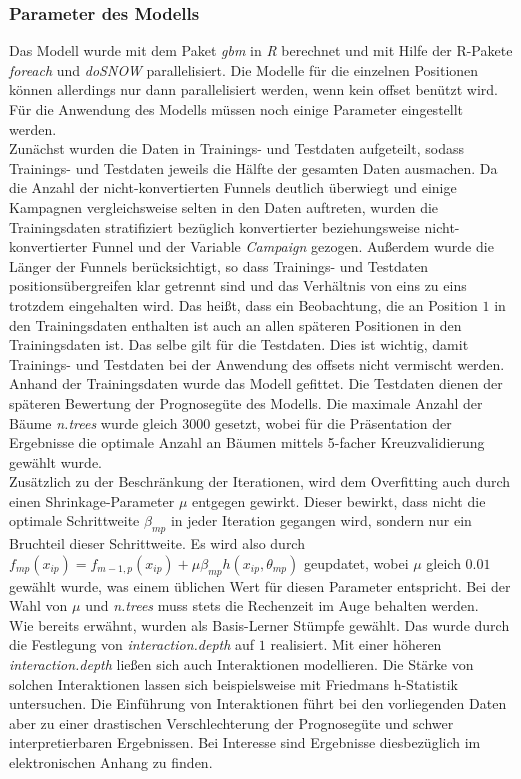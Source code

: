 \subsubsection*{Parameter des Modells}

Das Modell wurde mit dem Paket \textit{gbm} \cite{gbm} in \textit{R} \cite{r} berechnet und mit Hilfe der R-Pakete \textit{foreach} \cite{foreach} und \textit{doSNOW} \cite{dosnow} parallelisiert. Die Modelle für die einzelnen Positionen können allerdings nur dann parallelisiert werden, wenn kein offset benützt wird. Für die Anwendung des Modells müssen noch einige Parameter eingestellt werden.\\
Zunächst wurden die Daten in Trainings- und Testdaten aufgeteilt, sodass Trainings- und Testdaten jeweils die Hälfte der gesamten Daten ausmachen. Da die Anzahl der nicht-konvertierten Funnels deutlich überwiegt und einige Kampagnen vergleichsweise selten in den Daten auftreten, wurden die Trainingsdaten stratifiziert bezüglich konvertierter beziehungsweise nicht-konvertierter Funnel und der Variable \textit{Campaign} gezogen. Außerdem wurde die Länger der Funnels berücksichtigt, so dass  Trainings- und Testdaten positionsübergreifen klar getrennt sind und das Verhältnis von eins zu eins trotzdem eingehalten wird. Das heißt, dass ein Beobachtung, die an Position $1$ in den Trainingsdaten enthalten ist auch an allen späteren Positionen in den Trainingsdaten ist. Das selbe gilt für die Testdaten. Dies ist wichtig, damit Trainings- und Testdaten bei der Anwendung des offsets nicht vermischt werden. Anhand der Trainingsdaten wurde das Modell gefittet. Die Testdaten dienen der späteren Bewertung der Prognosegüte des Modells. Die maximale Anzahl der Bäume \textit{n.trees} wurde gleich $3000$ gesetzt, wobei für die Präsentation der Ergebnisse die optimale Anzahl an Bäumen mittels 5-facher Kreuzvalidierung gewählt wurde.\\
Zusätzlich zu der Beschränkung der Iterationen, wird dem Overfitting auch durch einen Shrinkage-Parameter $\mu$ entgegen gewirkt. Dieser bewirkt, dass nicht die optimale Schrittweite $\beta_{mp}$ in jeder Iteration gegangen wird, sondern nur ein Bruchteil dieser Schrittweite. Es wird also durch $f_{mp}(x_{ip}) = f_{m-1,p}(x_{ip}) + \mu \beta_{mp} h(x_{ip},\theta_{mp})$ geupdatet, wobei $\mu$ gleich $0.01$ gewählt wurde, was einem üblichen Wert für diesen Parameter entspricht. Bei der Wahl von $\mu$ und \textit{n.trees} muss stets die Rechenzeit im Auge behalten werden.\\
Wie bereits erwähnt, wurden als Basis-Lerner Stümpfe gewählt. Das wurde durch die Festlegung von \textit{interaction.depth} auf $1$ realisiert. Mit einer höheren \textit{interaction.depth} ließen sich auch Interaktionen modellieren. Die Stärke von solchen Interaktionen lassen sich beispielsweise mit Friedmans h-Statistik \cite{friedman_h} untersuchen. Die Einführung von Interaktionen führt bei den vorliegenden Daten aber zu einer drastischen Verschlechterung der Prognosegüte und schwer interpretierbaren Ergebnissen. Bei Interesse sind Ergebnisse diesbezüglich im elektronischen Anhang zu finden.\\
